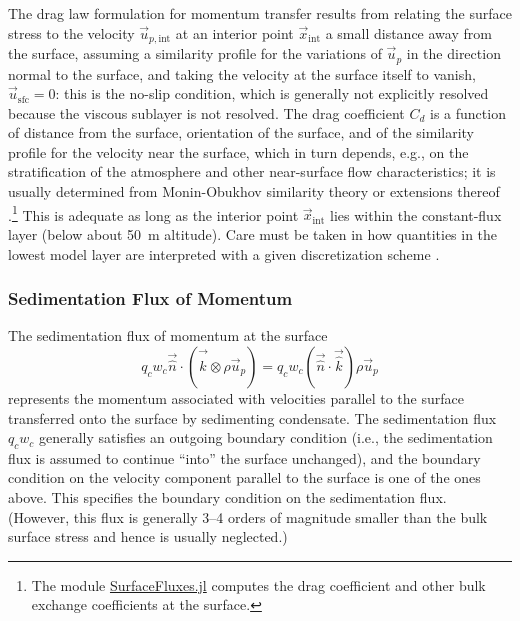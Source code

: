 \documentclass{report}
\begin{document}
The drag law formulation for momentum transfer results from relating the surface stress to the velocity $\vec{u}_{p, \mathrm{int}}$ at an interior point $\vec{x}_\mathrm{int}$ a small distance away from the surface, assuming a similarity profile for the variations of $\vec{u}_p$ in the direction normal to the surface, and taking the velocity at the surface itself to vanish, $\vec{u}_\mathrm{sfc} =0$: this is the no-slip condition, which is generally not explicitly resolved because the viscous sublayer is not resolved. The drag coefficient  $C_d$ is a function of distance from the surface, orientation of the surface, and of the similarity profile for the velocity near the surface, which in turn depends, e.g., on the stratification of the atmosphere and other near-surface flow characteristics; it is usually determined from Monin-Obukhov similarity theory or extensions thereof \citep{Foken06a}.\footnote{The module \href{https://github.com/climate-machine/CLIMA/tree/master/src/Atmos/Parameterizations/SurfaceFluxes}{SurfaceFluxes.jl} computes the drag coefficient and other bulk exchange coefficients at the surface.} This is adequate as long as the interior point $\vec{x}_\mathrm{int}$ lies within the constant-flux layer (below about 50~m altitude). Care must be taken in how quantities in the lowest model layer are interpreted with a given discretization scheme \citep{Nishizawa18a}.



\subsubsection{Sedimentation Flux of Momentum}

The sedimentation flux of momentum at the surface
\[
 q_c w_c \vec{\hat n} \cdot (\vec{\hat k} \otimes \rho \vec{u}_p) = q_c w_c (\vec{\hat n} \cdot \vec{\hat k}) \rho \vec{u}_p
\]
represents the momentum associated with velocities parallel to the surface transferred onto the surface by sedimenting condensate. The sedimentation flux $q_c w_c$ generally satisfies an outgoing boundary condition (i.e., the sedimentation flux is assumed to continue ``into'' the surface unchanged), and the boundary condition on the velocity component parallel to the surface is one of the ones above. This specifies the boundary condition on the sedimentation flux. (However, this flux is generally 3--4 orders of magnitude smaller than the bulk surface stress and hence is usually neglected.)
\end{document}
